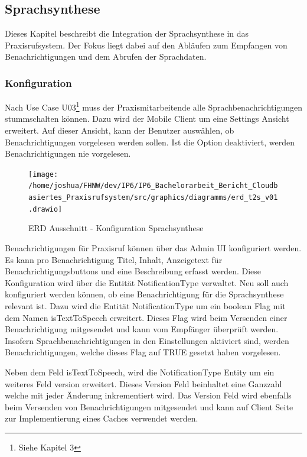 \subsection{Sprachsynthese}

Dieses Kapitel beschreibt die Integration der Sprachsynthese in das Praxisrufsystem.
Der Fokus liegt dabei auf den Abläufen zum Empfangen von Benachrichtigungen und dem Abrufen der Sprachdaten.

\subsubsection{Konfiguration}

Nach Use Case U03\footnote{Siehe Kapitel 3} muss der Praxismitarbeitende alle Sprachbenachrichtigungen stummschalten können.
Dazu wird der Mobile Client um eine Settings Ansicht erweitert.
Auf dieser Ansicht, kann der Benutzer auswählen, ob Benachrichtigungen vorgelesen werden sollen.
Ist die Option deaktiviert, werden Benachrichtigungen nie vorgelesen.

\begin{figure}[h]
    \centering
    \begin{minipage}[b]{0.75\textwidth}
        \texttt{[image: /home/joshua/FHNW/dev/IP6/IP6\_Bachelorarbeit\_Bericht\_Cloudbasiertes\_Praxisrufsystem/src/graphics/diagramms/erd\_t2s\_v01.drawio]}
        \caption{ERD Ausschnitt - Konfiguration Sprachsynthese}
    \end{minipage}
\end{figure}

Benachrichtigungen für Praxisruf können über das Admin UI konfiguriert werden.
Es kann pro Benachrichtigung Titel, Inhalt, Anzeigetext für Benachrichtigungsbuttons und eine Beschreibung erfasst werden.
Diese Konfiguration wird über die Entität NotificationType verwaltet.
Neu soll auch konfiguriert werden können, ob eine Benachrichtigung für die Sprachsynthese relevant ist.
Dazu wird die Entität NotificationType um ein boolean Flag mit dem Namen isTextToSpeech erweitert.
Dieses Flag wird beim Versenden einer Benachrichtigung mitgesendet und kann vom Empfänger überprüft werden.
Insofern Sprachbenachrichtigungen in den Einstellungen aktiviert sind, werden Benachrichtigungen, welche dieses Flag auf TRUE gesetzt haben vorgelesen.

Neben dem Feld isTextToSpeech, wird die NotificationType Entity um ein weiteres Feld version erweitert.
Dieses Version Feld beinhaltet eine Ganzzahl welche mit jeder Änderung inkrementiert wird.
Das Version Feld wird ebenfalls beim Versenden von Benachrichtigungen mitgesendet und kann auf Client Seite zur Implementierung eines Caches verwendet werden.


